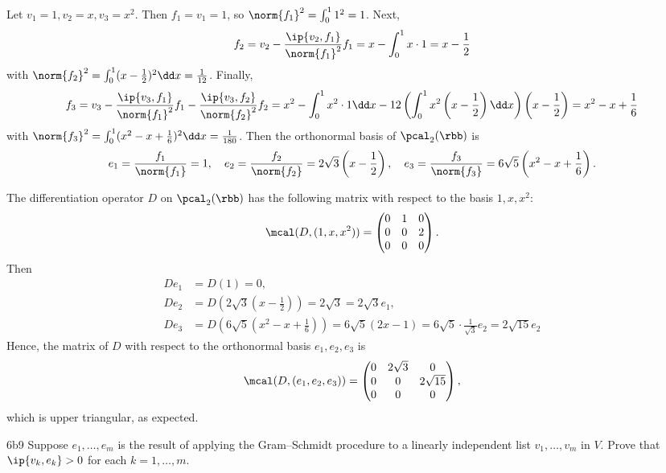 \begin{solenum}
    \item Let $v_1 = 1, v_2 = x, v_3 = x^2$.
    Then $f_1 = v_1 = 1$, so $\norm{f_1}^2 = \int_0^1 1^2 = 1$.
    Next,
    \[
        f_2 = v_2 - \frac{\ip{v_2, f_1}}{\norm{f_1}^2}f_1 = x - \int_0^1 x \cdot 1 = x - \frac{1}{2}
    \]
    with $\norm{f_2}^2 = \int_0^1 (x - \frac{1}{2})^2 \dd x = \frac{1}{12}$.
    Finally,
    \[
        f_3 = v_3 - \frac{\ip{v_3, f_1}}{\norm{f_1}^2}f_1 - \frac{\ip{v_3, f_2}}{\norm{f_2}^2}f_2 = x^2 - \int_0^1 x^2 \cdot 1 \dd x - 12\left(\int_0^1 x^2\left(x - \frac{1}{2}\right) \dd x\right)\left(x - \frac{1}{2}\right) = x^2 - x + \frac{1}{6}
    \]
    with $\norm{f_3}^2 = \int_0^1 (x^2 - x + \frac{1}{6})^2 \dd x = \frac{1}{180}$.
    Then the orthonormal basis of $\pcal_2(\rbb)$ is
    \[
        e_1 = \frac{f_1}{\norm{f_1}} = 1, \quad
        e_2 = \frac{f_2}{\norm{f_2}} = 2\sqrt{3}\left(x - \frac{1}{2}\right), \quad
        e_3 = \frac{f_3}{\norm{f_3}} = 6\sqrt{5}\left(x^2 - x + \frac{1}{6}\right).
    \]
    \item The differentiation operator $D$ on $\pcal_2(\rbb)$ has the following matrix with respect to the basis $1, x, x^2$:
    \[
        \mcal(D, (1, x, x^2)) =
        \begin{pmatrix}
            0 & 1 & 0 \\
            0 & 0 & 2 \\
            0 & 0 & 0
        \end{pmatrix}.
    \]
    Then
    \begin{align*}
        De_1 &= D(1) = 0, \\
        De_2 &= D\left(2\sqrt{3}\left(x - \frac{1}{2}\right)\right) = 2\sqrt{3} = 2\sqrt{3}e_1, \\
        De_3 &= D\left(6\sqrt{5}\left(x^2 - x + \frac{1}{6}\right)\right) = 6\sqrt{5}(2x - 1) = 6\sqrt{5} \cdot \frac{1}{\sqrt{3}}e_2 = 2\sqrt{15}e_2
    \end{align*}
    Hence, the matrix of $D$ with respect to the orthonormal basis $e_1, e_2, e_3$ is
    \[
        \mcal(D, (e_1, e_2, e_3)) =
        \begin{pmatrix}
            0 & 2\sqrt{3} & 0 \\
            0 & 0 & 2\sqrt{15} \\
            0 & 0 & 0
        \end{pmatrix},
    \]
    which is upper triangular, as expected.
\end{solenum}

\begin{exercise}{6b9}
    Suppose $e_1, \ldots, e_m$ is the result of applying the Gram--Schmidt procedure to a linearly independent list $v_1, \ldots, v_m$ in $V$.
    Prove that $\ip{v_k, e_k} > 0$ for each $k = 1, \ldots, m$.
\end{exercise}

